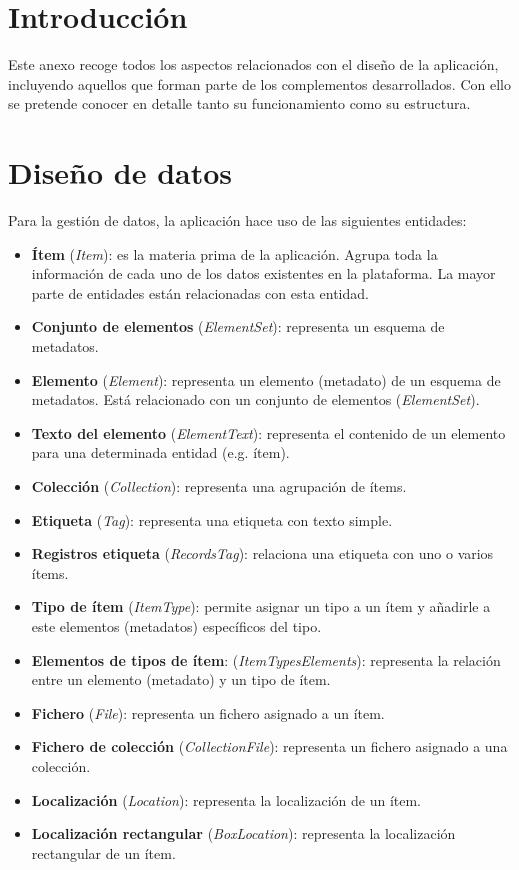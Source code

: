 
\section{Introducción}

Este anexo recoge todos los aspectos relacionados con el diseño de la
aplicación, incluyendo aquellos que forman parte de los complementos
desarrollados. Con ello se pretende conocer en detalle tanto su
funcionamiento como su estructura.


\section{Diseño de datos}

Para la gestión de datos, la aplicación hace uso de las siguientes
entidades:

\begin{itemize}
\tightlist
\item
  \textbf{Ítem} (\emph{Item}): es la materia prima de la aplicación.
  Agrupa toda la información de cada uno de los datos existentes en la
  plataforma. La mayor parte de entidades están relacionadas con esta
  entidad.
\item
  \textbf{Conjunto de elementos} (\emph{ElementSet}): representa un
  esquema de metadatos.
\item
  \textbf{Elemento} (\emph{Element}): representa un elemento (metadato)
  de un esquema de metadatos. Está relacionado con un conjunto de
  elementos (\emph{ElementSet}).
\item
  \textbf{Texto del elemento} (\emph{ElementText}): representa el
  contenido de un elemento para una determinada entidad (e.g. ítem).
\item
  \textbf{Colección} (\emph{Collection}): representa una agrupación de
  ítems.
\item
  \textbf{Etiqueta} (\emph{Tag}): representa una etiqueta con texto
  simple.
\item
  \textbf{Registros etiqueta} (\emph{RecordsTag}): relaciona una
  etiqueta con uno o varios ítems.
\item
  \textbf{Tipo de ítem} (\emph{ItemType}): permite asignar un tipo a un
  ítem y añadirle a este elementos (metadatos) específicos del tipo.
\item
  \textbf{Elementos de tipos de ítem}: (\emph{ItemTypesElements}):
  representa la relación entre un elemento (metadato) y un tipo de ítem.
\item
  \textbf{Fichero} (\emph{File}): representa un fichero asignado a un
  ítem.
\item
  \textbf{Fichero de colección} (\emph{CollectionFile}): representa un
  fichero asignado a una colección.
\item
  \textbf{Localización} (\emph{Location}): representa la localización de
  un ítem.
\item
  \textbf{Localización rectangular} (\emph{BoxLocation}): representa la
  localización rectangular de un ítem.
\end{itemize}

